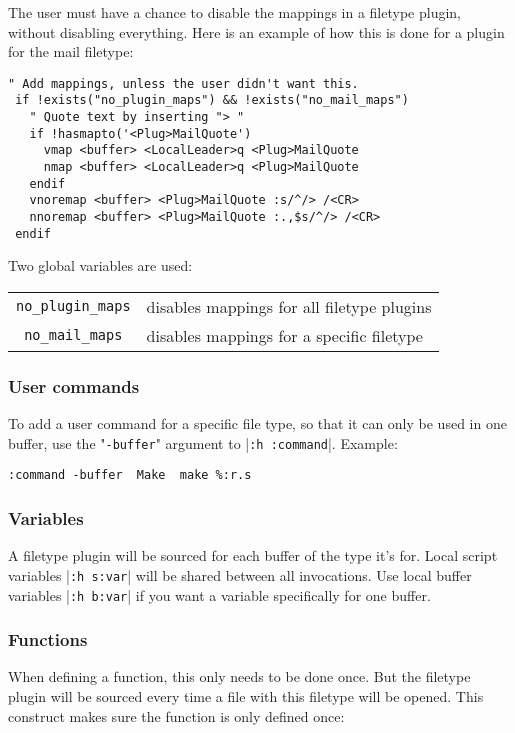 The user must have a chance to disable the mappings in a filetype plugin, without disabling everything.
Here is an example of how this is done for a plugin for the mail filetype:

\begin{Verbatim}[samepage=true]
 " Add mappings, unless the user didn't want this.
 if !exists("no_plugin_maps") && !exists("no_mail_maps")
   " Quote text by inserting "> "
   if !hasmapto('<Plug>MailQuote')
     vmap <buffer> <LocalLeader>q <Plug>MailQuote
     nmap <buffer> <LocalLeader>q <Plug>MailQuote
   endif
   vnoremap <buffer> <Plug>MailQuote :s/^/> /<CR>
   nnoremap <buffer> <Plug>MailQuote :.,$s/^/> /<CR>
 endif
\end{Verbatim}

Two global variables are used:
\begin{center} \begin{tabular}{c l}
				\verb!no_plugin_maps! & disables mappings for all filetype plugins \\
				\verb!no_mail_maps! & disables mappings for a specific filetype \\
\end{tabular} \end{center}

\subsubsection{User commands}
To add a user command for a specific file type, so that it can only be used in one buffer, use the "\verb!-buffer!" argument to |\verb!:h :command!|.
Example:

\begin{Verbatim}[samepage=true]
 :command -buffer  Make  make %:r.s
\end{Verbatim}

\subsubsection{Variables}
A filetype plugin will be sourced for each buffer of the type it's for.
Local script variables |\verb!:h s:var!| will be shared between all invocations.
Use local buffer variables |\verb!:h b:var!| if you want a variable specifically for one buffer.

\subsubsection{Functions}
When defining a function, this only needs to be done once.
But the filetype plugin will be sourced every time a file with this filetype will be opened.
This construct makes sure the function is only defined once:

